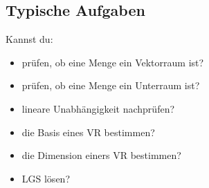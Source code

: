 \subsection{Typische Aufgaben}
Kannst du:
\begin{itemize}
	\item prüfen, ob eine Menge ein Vektorraum ist?
	\item prüfen, ob eine Menge ein Unterraum ist?
	\item lineare Unabhängigkeit nachprüfen?
	\item die Basis eines VR bestimmen?
	\item die Dimension einers VR bestimmen?
	\item LGS lösen?
\end{itemize}


